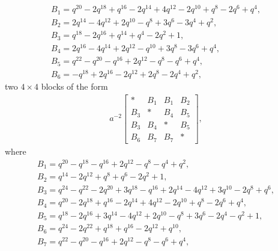 \documentclass[pdftex]{sigma}
\numberwithin{equation}{section}
\theoremstyle{definition}
\newcommand{\flac}[2]{#1}
\begin{document}
\begin{gather*}
 B_1 =
\flac{q^{20}}{a^2}-\flac{2q^{18}}{a^2}+\flac{q^{16}}{a^2}-\flac{2q^{14}}{a^2}+\flac{4q^{12}}{a^2}-\flac{2q^{10}}{a^2}+\flac{q^{8}}{a^2}-\flac{2q^{6}}{a^2}+\flac{q^{4}}{a^2}, \\
 B_2 =
\flac{2q^{14}}{a^2}-\flac{4q^{12}}{a^2}+\flac{2q^{10}}{a^2}-\flac{q^{8}}{a^2}+\flac{3q^{6}}{a^2}-\flac{3q^{4}}{a^2}+\flac{q^{2}}{a^2}, \\
 B_3 =
\flac{q^{18}}{a^2}-\flac{2q^{16}}{a^2}+\flac{q^{14}}{a^2}+\flac{q^{4}}{a^2}-\flac{2q^{2}}{a^2}+\flac{1}{a^2}, \\
 B_4 =
\flac{2q^{16}}{a^2}-\flac{4q^{14}}{a^2}+\flac{2q^{12}}{a^2}-\flac{q^{10}}{a^2}+\flac{3q^{8}}{a^2}-\flac{3q^{6}}{a^2}+\flac{q^{4}}{a^2}, \\
 B_5 =
\flac{q^{22}}{a^2}-\flac{q^{20}}{a^2}-\flac{q^{16}}{a^2}+\flac{2q^{12}}{a^2}-\flac{q^{8}}{a^2}-\flac{q^{6}}{a^2}+\flac{q^{4}}{a^2}, \\
 B_6 =
-\flac{q^{18}}{a^2}+\flac{2q^{16}}{a^2}-\flac{2q^{12}}{a^2}+\flac{2q^{8}}{a^2}-\flac{2q^{4}}{a^2}+\flac{q^{2}}{a^2},
\end{gather*}
two $4 \times 4$ blocks of the form
\begin{align*}
 a^{-2} \begin{bmatrix}
 * & B_1 & B_1 & B_2 \\
 B_3 & * & B_4 & B_5 \\
 B_3 & B_4 & * & B_5 \\
 B_6 & B_7 & B_7 & *
 \end{bmatrix},
\end{align*}
where
\begin{gather*}
 B_1 =
\flac{q^{20}}{a^2}-\flac{q^{18}}{a^2}-\flac{q^{16}}{a^2}+\flac{2q^{12}}{a^2}-\flac{q^{8}}{a^2}-\flac{q^{4}}{a^2}+\flac{q^{2}}{a^2}, \\
 B_2 =
\flac{q^{14}}{a^2}-\flac{2q^{12}}{a^2}+\flac{q^{8}}{a^2}+\flac{q^{6}}{a^2}-\flac{2q^{2}}{a^2}+\flac{1}{a^2}, \\
 B_3 =
\flac{q^{24}}{a^2}-\flac{q^{22}}{a^2}-\flac{2q^{20}}{a^2}+\flac{3q^{18}}{a^2}-\flac{q^{16}}{a^2}+\flac{2q^{14}}{a^2}-\flac{4q^{12}}{a^2}+\flac{3q^{10}}{a^2}-\flac{2q^{8}}{a^2}+\flac{q^{6}}{a^2}, \\
 B_4 =
\flac{q^{20}}{a^2}-\flac{2q^{18}}{a^2}+\flac{q^{16}}{a^2}-\flac{2q^{14}}{a^2}+\flac{4q^{12}}{a^2}-\flac{2q^{10}}{a^2}+\flac{q^{8}}{a^2}-\flac{2q^{6}}{a^2}+\flac{q^{4}}{a^2},\\
 B_5 =
\flac{q^{18}}{a^2}-\flac{2q^{16}}{a^2}+\flac{3q^{14}}{a^2}-\flac{4q^{12}}{a^2}+\flac{2q^{10}}{a^2}-\flac{q^{8}}{a^2}+\flac{3q^{6}}{a^2}-\flac{2q^{4}}{a^2}-\flac{q^{2}}{a^2}+\flac{1}{a^2}, \\
 B_6 =
\flac{q^{24}}{a^2}-\flac{2q^{22}}{a^2}+\flac{q^{18}}{a^2}+\flac{q^{16}}{a^2}-\flac{2q^{12}}{a^2}+\flac{q^{10}}{a^2}, \\
 B_7 =
\flac{q^{22}}{a^2}-\flac{q^{20}}{a^2}-\flac{q^{16}}{a^2}+\flac{2q^{12}}{a^2}-\flac{q^{8}}{a^2}-\flac{q^{6}}{a^2}+\flac{q^{4}}{a^2},
\end{gather*}
\end{document}
